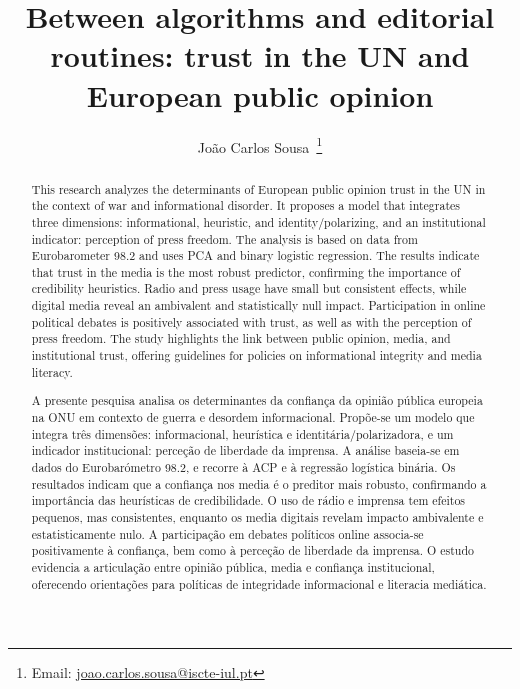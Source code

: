 \documentclass[english]{textolivre}
\title{Between algorithms and editorial routines: trust in the UN and European public opinion}
\author[1,2]{João Carlos Sousa~\orcid{0000-0003-3884-2177}\thanks{Email: \href{mailto:joao.carlos.sousa@iscte-iul.pt}{joao.carlos.sousa@iscte-iul.pt}}}
\affil[1]{Instituto Universitario de Lisboa, Centro de Investigação e Estudos de Sociologia, Lisboa, Portugal.}
\affil[2]{Instituto Politécnico de Santarém, Escola Superior Agrária de Santarém, Quinta do Galinheiro, Santarém, Portugal.}
\begin{document}
\maketitle

\begin{polyabstract}
\begin{abstract}
This research analyzes the determinants of European public opinion trust in the UN in the context of war and informational disorder. It proposes a model that integrates three dimensions: informational, heuristic, and identity/polarizing, and an institutional indicator: perception of press freedom. The analysis is based on data from Eurobarometer 98.2 and uses PCA and binary logistic regression. The results indicate that trust in the media is the most robust predictor, confirming the importance of credibility heuristics. Radio and press usage have small but consistent effects, while digital media reveal an ambivalent and statistically null impact. Participation in online political debates is positively associated with trust, as well as with the perception of press freedom. The study highlights the link between public opinion, media, and institutional trust, offering guidelines for policies on informational integrity and media literacy.

\end{abstract}

\begin{portuguese}
\begin{abstract}
A presente pesquisa analisa os determinantes da confiança da opinião pública europeia na ONU em contexto de guerra e desordem informacional. Propõe-se um modelo que integra três dimensões: informacional, heurística e identitária/polarizadora, e um indicador institucional: perceção de liberdade da imprensa. A análise baseia-se em dados do Eurobarómetro 98.2, e recorre à ACP e à regressão logística binária. Os resultados indicam que a confiança nos media é o preditor mais robusto, confirmando a importância das heurísticas de credibilidade. O uso de rádio e imprensa tem efeitos pequenos, mas consistentes, enquanto os media digitais revelam impacto ambivalente e estatisticamente nulo. A participação em debates políticos online associa-se positivamente à confiança, bem como à perceção de liberdade da imprensa. O estudo evidencia a articulação entre opinião pública, media e confiança institucional, oferecendo orientações para políticas de integridade informacional e literacia mediática.

\end{abstract}
\end{portuguese}
\end{polyabstract}
\end{document}
